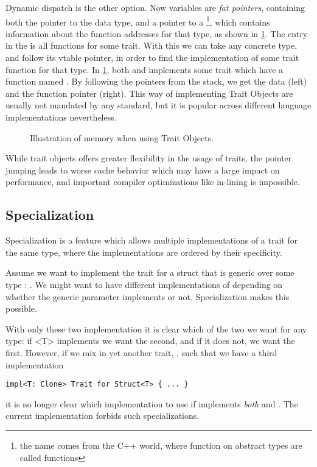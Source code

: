 Dynamic dispatch is the other option. Now variables are \emph{fat pointers}, containing both the
pointer to the data type, and a pointer to a \footnote{the name  comes
from the C++ world, where function on abstract types are called  functions}, which
contains information about the function addresses for that type, as shown in
\cref{fig:trait-objects}. The entry in the  is all functions for some trait. With this
we can take any concrete type, and follow its vtable pointer, in order to find the implementation
of some trait function for that type. In \cref{fig:trait-objects}, both  and 
implements some trait which have a function named . By following the pointers from the
stack, we get the data (left) and the function pointer (right). This way of implementing Trait
Objects are usually not mandated by any standard, but it is popular across different language
implementations nevertheless.

\begin{figure}[ht]
  \centering
  
  \caption{Illustration of memory when using Trait Objects.\label{fig:trait-objects}}
\end{figure}

While trait objects offers greater flexibility in the usage of traits, the pointer jumping leads to
worse cache behavior which may have a large impact on performance, and important compiler
optimizations like in-lining is impossible.



\subsection{Specialization\label{sec:specialization}}

Specialization is a feature which allows multiple implementations of a trait for the same type,
where the implementations are ordered by their specificity.

Assume we want to implement the trait  for a struct that is generic over some type
: . We might want to have different implementations of 
depending on whether the generic parameter  implements  or not.
Specialization makes this possible.


With only these two implementation it is clear which of the two we want for any type: if \code<T>
implements  we want the second, and if it does not, we want the first. However, if we
mix in yet another trait, , such that we have a third implementation
\begin{lstlisting}[style=Rust]
impl<T: Clone> Trait for Struct<T> { ... }
\end{lstlisting}
it is no longer clear which implementation to use if  implements \emph{both} 
and . The current implementation forbids such specializations.


